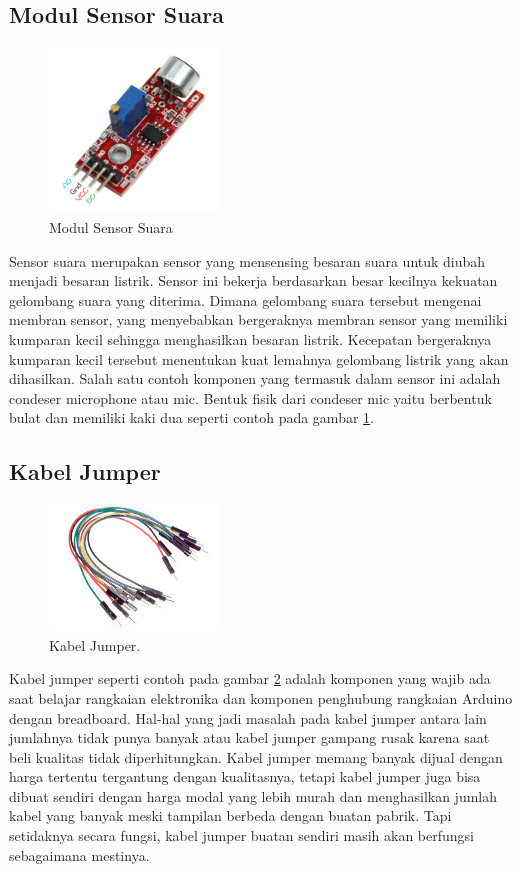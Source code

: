 \subsection{Modul Sensor Suara}
\begin{figure}[ht]
\centerline{\includegraphics[width=0.4\textwidth]{figures/sssensorsuara.png}}
\caption{Modul Sensor Suara}
\label{sssensorsuara}
\end{figure}
Sensor suara merupakan sensor yang mensensing besaran suara untuk diubah menjadi besaran listrik. Sensor ini bekerja berdasarkan besar kecilnya kekuatan gelombang suara yang diterima. Dimana gelombang suara tersebut mengenai membran sensor, yang menyebabkan bergeraknya membran sensor yang memiliki kumparan kecil sehingga menghasilkan besaran listrik. Kecepatan bergeraknya kumparan kecil tersebut menentukan kuat lemahnya gelombang listrik yang akan dihasilkan. Salah satu contoh komponen yang termasuk dalam sensor ini adalah condeser microphone atau mic. Bentuk fisik dari condeser mic yaitu berbentuk bulat dan memiliki kaki dua seperti contoh pada gambar \ref{sssensorsuara}.
\subsection{Kabel Jumper}
\begin{figure}[ht]
\centerline{\includegraphics[width=0.4\textwidth]{figures/kabeljumper.jpg}}
\caption{Kabel Jumper.}
\label{kabeljumper}
\end{figure}
Kabel jumper seperti contoh pada gambar \ref{kabeljumper} adalah komponen yang wajib ada saat belajar rangkaian elektronika dan komponen penghubung rangkaian Arduino dengan breadboard. Hal-hal yang jadi masalah pada kabel jumper antara lain jumlahnya tidak punya banyak atau kabel jumper gampang rusak karena saat beli kualitas tidak diperhitungkan.
Kabel jumper memang banyak dijual dengan harga tertentu tergantung dengan kualitasnya, tetapi kabel jumper juga bisa dibuat sendiri dengan harga modal yang lebih murah dan menghasilkan jumlah kabel yang banyak meski tampilan berbeda dengan buatan pabrik. Tapi setidaknya secara fungsi, kabel jumper buatan sendiri masih akan berfungsi sebagaimana mestinya.

